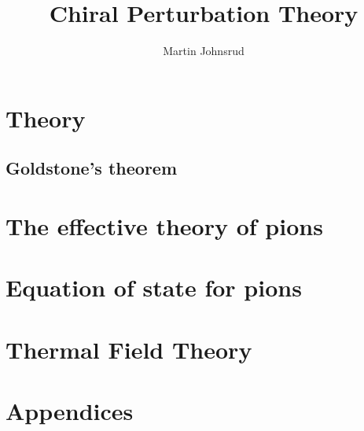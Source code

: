 \documentclass{book}
\title{Chiral Perturbation Theory}
\author{Martin Johnsrud}
\begin{document}
\maketitle 

\tableofcontents

\chapter{Theory}



\section{Goldstone's theorem}



\chapter{The effective theory of pions}
\label{serction:effective_pion_lagrangian}








\chapter{Equation of state for pions}



\chapter{Thermal Field Theory}
\label{section:thermal field theory}







\appendix
\chapter{Appendices}





\end{document}
